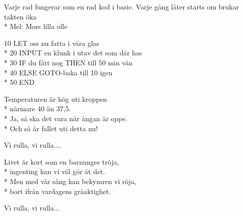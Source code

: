 \begin{SongText}
    \begin{SongInfo}
        Varje rad fungerar som en rad kod i basic.
        Varje gång låter starts om brukar takten öka\\*%
        Mel: Mors lilla olle
    \end{SongInfo}
    \begin{SongVerse}
        10 LET oss nu fatta i våra glas\\*%
        20 INPUT en klunk i utav det som där has\\*%
        30 IF du fått nog THEN till 50 min vän\\*%
        40 ELSE GOTO-baka till 10 igen\\*%
        50 END
    \end{SongVerse}
\end{SongText}
\begin{SongText}[Temperaturen]
    \begin{SongVerse}
        Temperaturen är hög uti kroppen\\*%
        närmare 40 än 37,5.\\*%
        Ja, så ska det vara när ångan är oppe.\\*%
        Och så är fallet uti detta nu!
    \end{SongVerse}
    \begin{SongVerse}
        Vi rulla, vi rulla....
    \end{SongVerse}
    \begin{SongVerse}
        Livet är kort som en barnunges tröja,\\*%
        ingenting kan vi väl gör åt det.\\*%
        Men med vår sång kan bekymren vi röja,\\*%
        bort ifrån vardagens gråaktighet.
    \end{SongVerse}
    \begin{SongVerse}
        Vi rulla, vi rulla...
    \end{SongVerse}
\end{SongText}
